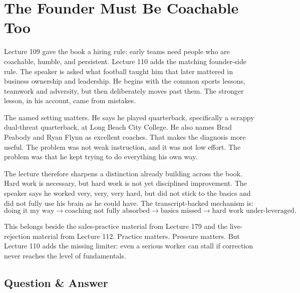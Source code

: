 \documentclass[11pt,oneside]{book}
\begin{document}

\section{The Founder Must Be Coachable Too}

Lecture 109 gave the book a hiring rule: early teams need people who are coachable, humble, and persistent. Lecture 110 adds the matching founder-side rule. The speaker is asked what football taught him that later mattered in business ownership and leadership. He begins with the common sports lessons, teamwork and adversity, but then deliberately moves past them. The stronger lesson, in his account, came from mistakes.

The named setting matters. He says he played quarterback, specifically a scrappy dual-threat quarterback, at Long Beach City College. He also names Brad Peabody and Ryan Flynn as excellent coaches. That makes the diagnosis more useful. The problem was not weak instruction, and it was not low effort. The problem was that he kept trying to do everything his own way.

The lecture therefore sharpens a distinction already building across the book. Hard work is necessary, but hard work is not yet disciplined improvement. The speaker says he worked very, very, very hard, but did not stick to the basics and did not fully use his brain as he could have. The transcript-backed mechanism is:
\[
\text{doing it my way}
\longrightarrow
\text{coaching not fully absorbed}
\longrightarrow
\text{basics missed}
\longrightarrow
\text{hard work under-leveraged}.
\]

This belongs beside the sales-practice material from Lecture 179 and the live-rejection material from Lecture 112. Practice matters. Pressure matters. But Lecture 110 adds the missing limiter: even a serious worker can stall if correction never reaches the level of fundamentals.

\subsection{Question \& Answer}
\end{document}
